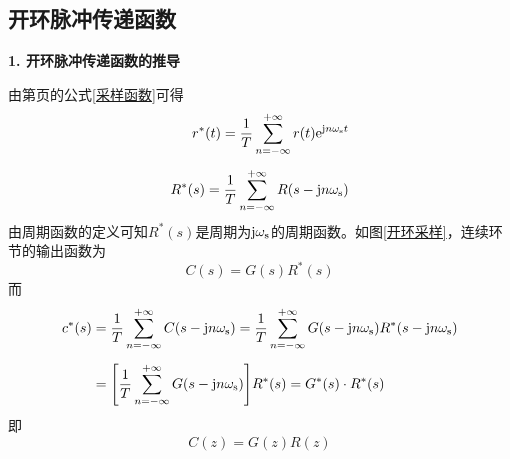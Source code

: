 \subsection{开环脉冲传递函数}
\noindent \textbf{1. 开环脉冲传递函数的推导}

由第\pageref{采样函数}页的公式\eqref{采样函数}可得
\begin{align}
	r^*(t) = \dfrac{1}{T}\sum_{n = -\infty}^{+\infty}r(t){\rm{e}}^{\text{j} n \omega_\text{s}t}\\[0.5em]
	R^*(s) = \dfrac{1}{T}\sum_{n = -\infty}^{+\infty}R(s - \text{j} n \omega_\text{s})
\end{align}
由周期函数的定义可知$R^*(s)$是周期为$\text{j} \omega_\text{s}$的周期函数。如图\ref{开环采样}，连续环节的输出函数为
\begin{equation}
	C(s) = G(s)R^*(s)
\end{equation}
而
\begin{align}
	c^*(s) &= \dfrac{1}{T}\sum_{n = -\infty}^{+\infty}C(s - \text{j} n \omega_\text{s}) = \dfrac{1}{T}\sum_{n = -\infty}^{+\infty}G(s - \text{j} n \omega_\text{s}) R^*(s - \text{j} n \omega_\text{s}) \notag \\[0.5em]
	& = \Bigg[\dfrac{1}{T}\sum_{n = -\infty}^{+\infty}G(s - \text{j} n \omega_\text{s})\Bigg] R^*(s) =G^*(s)\cdot R^*(s)
\end{align}
即
\begin{equation}
	C(z) = G(z)R(z)
\end{equation}

